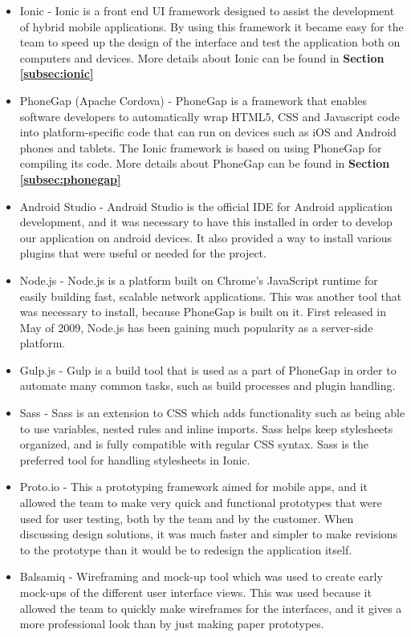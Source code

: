 \begin{itemize}
	\item Ionic \cite{es1} - Ionic is a front end UI framework designed to assist the development of hybrid mobile applications. By using this framework it became easy for the team to speed up the design of the interface and test the application both on computers and devices. More details about Ionic can be found in \textbf{Section \ref{subsec:ionic}}
	\item PhoneGap (Apache Cordova) \cite{RA2} - PhoneGap is a framework that enables software developers to automatically wrap HTML5, CSS and Javascript code into platform-specific code that can run on devices such as iOS and Android phones and tablets. The Ionic framework is based on using PhoneGap for compiling its code. More details about PhoneGap can be found in \textbf{Section \ref{subsec:phonegap}}
	\item Android Studio \cite{es22} - Android Studio is the official IDE for Android application development, and it was necessary to have this installed in order to develop our application on android devices. It also provided a way to install various plugins that were useful or needed for the project.
	\item Node.js \cite{es23} - Node.js is a platform built on Chrome’s JavaScript runtime for easily building fast, scalable network applications. This was another tool that was necessary to install, because PhoneGap is built on it. First released in May of 2009, Node.js has been gaining much popularity as a server-side platform. 
	\item Gulp.js \cite{es24} - Gulp is a build tool that is used as a part of PhoneGap in order to automate many common tasks, such as build processes and plugin handling.
	\item Sass \cite{es25} - Sass is an extension to CSS which adds functionality such as being able to use variables, nested rules and inline imports. Sass helps keep stylesheets organized, and is fully compatible with regular CSS syntax. Sass is the preferred tool for handling stylesheets in Ionic.
	\item Proto.io \cite{protoIO} - This a prototyping framework aimed for mobile apps, and it allowed the team to make very quick and functional prototypes that were used for user testing, both by the team and by the customer. When discussing design solutions, it was much faster and simpler to make revisions to the prototype than it would be to redesign the application itself. 
	\item Balsamiq \cite{es3} - Wireframing and mock-up tool which was used to create early mock-ups of the different user interface views. This was used because it allowed the team to quickly make wireframes for the interfaces, and it gives a more professional look than by  just making paper prototypes.

\end{itemize}
